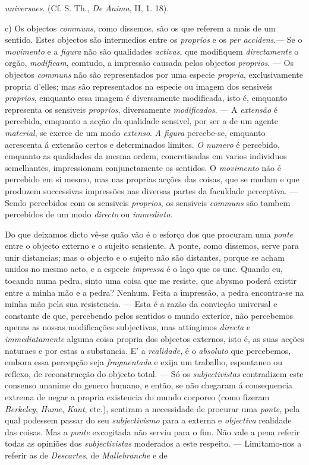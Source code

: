 \emph{universaes}. (Cf. S. Th., \emph{De Anima}, II, 1. 18).\par c) Os objectos \emph{communs}, como dissemos, são os que referem a mais de um sentido. Estes objectos são intermedios entre os \emph{proprios} e os \emph{per accidens}.--- Se o \emph{movimento} e a \emph{figura} não são qualidades \emph{activas}, que modifiquem \emph{directamente} o orgão, \emph{modificam}, comtudo, a impressão causada pelos objectos \emph{proprios}. --- Os objectos \emph{communs} não são representados por uma especie \emph{propria}, exclusivamente propria d'elles; mas são representados na especie ou imagem dos sensiveis \emph{proprios}, emquanto essa imagem é diversamente modificada, isto é, emquanto representa os sensiveis \emph{proprios}, diversamente \emph{modificados}. --- A \emph{extensão} é percebida, emquanto a acção da qualidade sensivel, por ser a de um agente \emph{material}, se exerce de um modo \emph{extenso}. \emph{A figura} percebe-se, emquanto acrescenta á extensão certos e determinados limites. \emph{O numero} é percebido, emquanto as qualidades da mesma ordem, concretisadas em varios individuos semelhantes, impressionam conjunctamente os sentidos. O \emph{movimento} não é percebido em si mesmo, mas nas proprias acções das coisas, que se mudam e que produzem successivas impressões nas diversas partes da faculdade perceptiva. --- Sendo percebidos com os sensiveis \emph{proprios}, os sensiveis \emph{communs} são tambem percebidos de um modo \emph{directo} ou \emph{immediato}.\par *\par Do que deixamos dicto vê-se quão vão é o esforço dos que procuram uma \emph{ponte} entre o objecto externo e o sujeito sensiente. A ponte, como dissemos, serve para unir distancias; mas o objecto e o sujeito não são distantes, porque se acham unidos no mesmo acto, e a especie \emph{impressa} é o laço que os une. Quando eu, tocando numa pedra, sinto uma coisa que me resiste, que abysmo poderá existir entre a minha mão e a pedra? Nenhum. Feita a impressão, a pedra encontra-se na minha mão pela sua resistencia. --- Esta é a razão da convicção universal e constante de que, percebendo pelos sentidos o mundo exterior, não percebemos apenas as nossas modificações subjectivas, mas attingimos \emph{directa} e \emph{immediatamente} alguma coisa propria dos objectos externos, isto é, as suas acções naturaes e por estas a substancia. E' a \emph{realidade}, é o \emph{absoluto} que percebemos, embora essa percepção seja \emph{fragmentada} e exija um trabalho, espontaneo ou reflexo, de reconstrucção do objecto total. --- Só os \emph{subjectivistas} contradizem este consenso unanime do genero humano, e então, se não chegaram á consequencia extrema de negar a propria existencia do mundo corporeo (como fizeram \emph{Berkeley}, \emph{Hume}, \emph{Kant}, etc.), sentiram a necessidade de procurar uma \emph{ponte}, pela qual podessem passar do seu \emph{subjectivismo} para a externa e \emph{objectiva} realidade das coisas. Mas a \emph{ponte} excogitada não serviu para o fim. Não vale a pena referir todas as opiniões dos \emph{subjectivistas} moderados a este respeito. --- Limitamo-nos a referir as de \emph{Descartes}, de \emph{Mallebranche} e de 